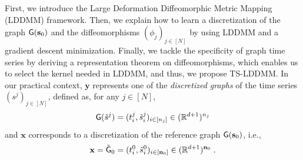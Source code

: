 First, we introduce the Large Deformation Diffeomorphic Metric Mapping (LDDMM) framework.
 Then, we explain how to learn a discretization of the graph $\mathsf{G}(\mathbf{s}_0)$ and the diffeomorphisms $(\phi_j)_{j\in[N]} $ by using LDDMM and a gradient descent minimization.
  Finally, we tackle the specificity of graph time series by deriving a representation theorem on diffeomorphisms, which enables us to select the kernel needed in LDDMM, and thus, we propose TS-LDDMM. 
  In our practical context, $\mathbf{y}$ represents one of the \textit{discretized graphs} of the time series $(s^j)_{j\in[N]}$, defined as, for any $j\in[N]$,
  \begin{equation}
   \label{eq:descretized_graph}
   \mathsf{G}(\tilde{s}^j)=(t_i^j,\tilde{s}^j_i)_{ i\in[n_j]}\in (\mathbb{R}^{d+1})^{n_j}
  \end{equation}
   and $\mathbf{x}$ corresponds to a discretization of the reference graph $\mathsf{G}(\mathbf{s}_0)$, i.e., 
   \begin{equation}
     \label{eq:descretized_referenced_graph}
     \mathbf{x}=\tilde{\mathsf{G}}_0=(t_i^0,\tilde{s}^0_i)_{i\in[\mathbf{n}_0]}\in (\mathbb{R}^{d+1})^{\mathbf{n}_0} \; . 
   \end{equation}

